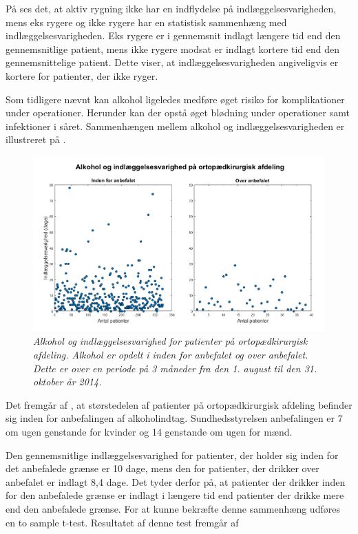 \noindent
På  ses det, at aktiv rygning ikke har en indflydelse på indlæggelsesvarigheden, mens eks rygere og ikke rygere har en statistisk sammenhæng med indlæggelsesvarigheden. Eks rygere er i gennemsnit indlagt længere tid end den gennemsnitlige patient, mens ikke rygere modsat er indlagt kortere tid end den gennemsnittelige patient. Dette viser, at indlæggelsesvarigheden angiveligvis er kortere for patienter, der ikke ryger. 


Som tidligere nævnt kan alkohol ligeledes medføre øget risiko for komplikationer under operationer. Herunder kan der opstå øget blødning under operationer samt infektioner i såret.\cite{Nordjylland2014} Sammenhængen mellem alkohol og indlæggelsesvarigheden er illustreret på  . 


\begin{figure}[H]
	\centering
	\includegraphics[scale=0.4]{figures/alkohologindlaeg}
	\caption{\textit{Alkohol og indlæggelsesvarighed for patienter på ortopædkirurgisk afdeling. Alkohol er opdelt i inden for anbefalet og over anbefalet. Dette er over en periode på 3 måneder fra den 1. august til den 31. oktober år 2014. }}
	\label{alkohologindlaeggelse}
\end{figure}

\noindent
Det fremgår af , at størstedelen af patienter på ortopædkirurgisk afdeling befinder sig inden for anbefalingen af alkoholindtag. Sundhedsstyrelsen anbefalingen er 7 om ugen genstande for kvinder og 14 genstande om ugen for mænd\cite{Sundhedsstyrelsen2016}.


Den gennemsnitlige indlæggelsesvarighed for patienter, der holder sig inden for det anbefalede grænse er 10 dage, mens den for patienter, der drikker over anbefalet er indlagt 8,4 dage. Det tyder derfor på, at patienter der drikker inden for den anbefalede grænse er indlagt i længere tid end patienter der drikke mere end den anbefalede grænse. 
For at kunne bekræfte denne sammenhæng udføres en to sample t-test. Resultatet af denne test fremgår af 


